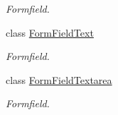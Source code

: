 \begin{DoxyCompactItemize}
\begin{DoxyCompactList}\small\item\em Formfield. \item\end{DoxyCompactList}\item 
class \hyperlink{classFormFieldText}{FormFieldText}
\begin{DoxyCompactList}\small\item\em Formfield. \item\end{DoxyCompactList}\item 
class \hyperlink{classFormFieldTextarea}{FormFieldTextarea}
\begin{DoxyCompactList}\small\item\em Formfield. \item\end{DoxyCompactList}\end{DoxyCompactItemize}
